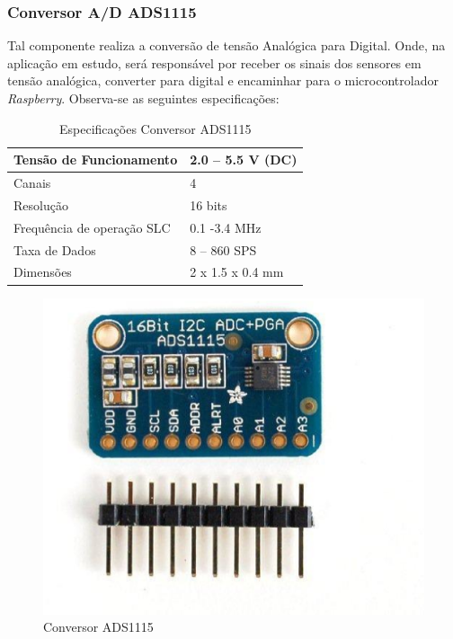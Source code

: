 \subsubsection{Conversor A/D ADS1115}

Tal componente realiza a conversão de tensão Analógica para Digital. Onde, na aplicação em estudo, será responsável por receber os sinais dos sensores em tensão analógica, converter para digital e encaminhar para o microcontrolador \textit{Raspberry}. Observa-se as seguintes especificações: \nocite{MPX5700}

\begin{table}[h]
\centering
\caption{Especificações Conversor ADS1115}
\label{table4}
\begin{tabular}{|l|l|}
\hline
Tensão de Funcionamento    & 2.0 – 5.5 V (DC) \\ \hline
Canais                     & 4                \\ \hline
Resolução                  & 16 bits          \\ \hline
Frequência de operação SLC & 0.1 -3.4 MHz     \\ \hline
Taxa de Dados              & 8 – 860 SPS      \\ \hline
Dimensões                  & 2 x 1.5 x 0.4 mm \\ \hline
\end{tabular}
\end{table}

\begin{figure}[h]
	\centering
	\includegraphics[keepaspectratio=true,scale=0.3]{figuras/sensor3.eps}
	\caption{Conversor ADS1115}
	\label{sensor3}
\end{figure}

